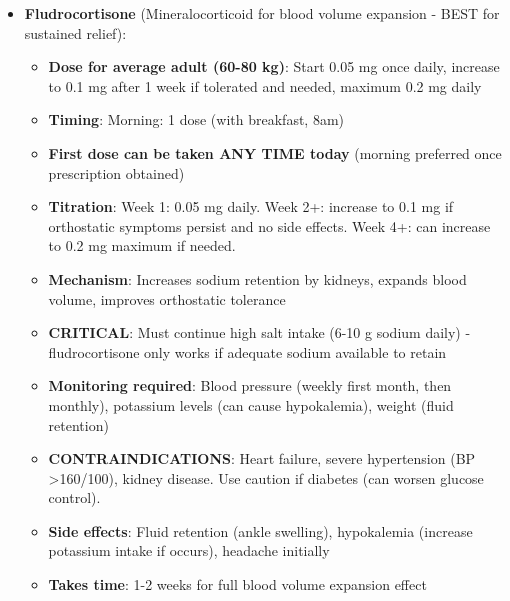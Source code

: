 \begin{enumerate}
\begin{itemize}
        \item \textbf{Fludrocortisone} (Mineralocorticoid for blood volume expansion - BEST for sustained relief):
        \begin{itemize}
            \item \textbf{Dose for average adult (60-80 kg)}: Start 0.05 mg once daily, increase to 0.1 mg after 1 week if tolerated and needed, maximum 0.2 mg daily
            \item \textbf{Timing}: Morning: 1 dose (with breakfast, 8am)
            \item \textbf{First dose can be taken ANY TIME today} (morning preferred once prescription obtained)
            \item \textbf{Titration}: Week 1: 0.05 mg daily. Week 2+: increase to 0.1 mg if orthostatic symptoms persist and no side effects. Week 4+: can increase to 0.2 mg maximum if needed.
            \item \textbf{Mechanism}: Increases sodium retention by kidneys, expands blood volume, improves orthostatic tolerance
            \item \textbf{CRITICAL}: Must continue high salt intake (6-10 g sodium daily) - fludrocortisone only works if adequate sodium available to retain
            \item \textbf{Monitoring required}: Blood pressure (weekly first month, then monthly), potassium levels (can cause hypokalemia), weight (fluid retention)
            \item \textbf{CONTRAINDICATIONS}: Heart failure, severe hypertension (BP >160/100), kidney disease. Use caution if diabetes (can worsen glucose control).
            \item \textbf{Side effects}: Fluid retention (ankle swelling), hypokalemia (increase potassium intake if occurs), headache initially
            \item \textbf{Takes time}: 1-2 weeks for full blood volume expansion effect
        \end{itemize}


\end{itemize}
\end{enumerate}

